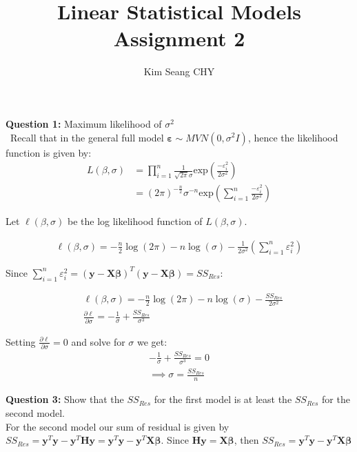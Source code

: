 \documentclass[12 pt, a4paper]{article}
\title{Linear Statistical Models Assignment 2}
\date{}
\author{Kim Seang CHY}
\begin{document}
\maketitle

\noindent \textbf{Question 1:} Maximum likelihood of $\sigma^2$\\

\noindent \ Recall that in the general full model $\boldsymbol{\varepsilon} \sim MVN(0,\sigma^2I) $, hence the likelihood function is given by:\\
\begin{align*}
L(\beta,\sigma)&=\prod_{i=1}^n \frac{1}{\sqrt{2 \pi} \sigma} \text{exp} \left( \frac{-\varepsilon_{i}^2}{2 \sigma^2} \right) \\
 &=(2 \pi)^{-\frac{n}{2}} \sigma^{-n} \text{exp} \left(\sum_{i=1}^{n} \frac{-\varepsilon_{i}^2}{2 \sigma^2} \right)
\end{align*}

\noindent Let $\ell(\beta,\sigma)$ be the log likelihood function of $L(\beta,\sigma)$.

\begin{align*}
\ell(\beta, \sigma)= -\frac{n}{2} \log(2 \pi)-n\log(\sigma) -\frac{1}{2\sigma^2}\left(\sum_{i=1}^{n}\varepsilon_{i}^2 \right)
\end{align*}

\noindent Since $\sum_{i=1}^{n}\varepsilon_{i}^2=(\textbf{y}-\textbf{X}\boldsymbol{\beta})^{T}(\textbf{y}-\textbf{X}\boldsymbol{\beta})=SS_{Res}$:


\begin{align*}
&\ell(\beta, \sigma)= -\frac{n}{2} \log(2 \pi)-n\log(\sigma) -\frac{SS_{Res}}{2\sigma^2}\\
&\frac{\partial \ell}{\partial \sigma}=-\frac{1}{\sigma}+\frac{SS_{Res}}{\sigma^3}
\end{align*}

\noindent Setting $\frac{\partial \ell}{\partial \sigma}=0$ and solve for $\sigma$ we get:
\begin{align*}
-\frac{1}{\sigma}+\frac{SS_{Res}}{\sigma^3}=0\\
\implies \sigma=\frac{SS_{Res}}{n}
\end{align*}


\pagebreak

\noindent \textbf{Question 3:} Show that the $SS_{Res}$ for the first model is at least the $SS_{Res}$ for the second model. \\

\noindent For the second model our sum of residual is given by  $SS_{Res}=\textbf{y}^T\textbf{y}-\textbf{y}^T\textbf{Hy}=\textbf{y}^T\textbf{y}-\textbf{y}^T\textbf{X}\boldsymbol{\beta}$. Since $\textbf{Hy}=\textbf{X}\boldsymbol{\beta}$, then $SS_{Res}=\textbf{y}^T\textbf{y}-\textbf{y}^T\textbf{X}\boldsymbol{\beta}$\\ 
\end{document}
